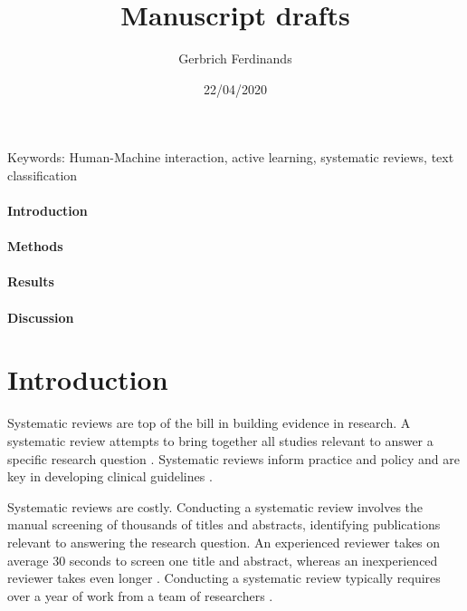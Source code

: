 \documentclass[
]{article}
\title{Manuscript drafts}
\author{Gerbrich Ferdinands}
\date{22/04/2020}
\begin{document}
\maketitle

Keywords: Human-Machine interaction, active learning, systematic
reviews, text classification

\hypertarget{introduction}{%
\paragraph{Introduction}\label{introduction}}

\hypertarget{methods}{%
\paragraph{Methods}\label{methods}}

\hypertarget{results}{%
\paragraph{Results}\label{results}}

\hypertarget{discussion}{%
\paragraph{Discussion}\label{discussion}}

\newpage

\hypertarget{introduction-1}{%
\section{Introduction}\label{introduction-1}}

Systematic reviews are top of the bill in building evidence in research.
A systematic review attempts to bring together all studies relevant to
answer a specific research question \autocite{PRISMA-PGroup2015}.
Systematic reviews inform practice and policy \autocite{Gough2002} and
are key in developing clinical guidelines \autocite{Chalmers2007}.

Systematic reviews are costly. Conducting a systematic review involves
the manual screening of thousands of titles and abstracts, identifying
publications relevant to answering the research question. An experienced
reviewer takes on average 30 seconds to screen one title and abstract,
whereas an inexperienced reviewer takes even longer
\autocite{Wallace2010}. Conducting a systematic review typically
requires over a year of work from a team of researchers
\autocite{Borah2017}.
\end{document}
